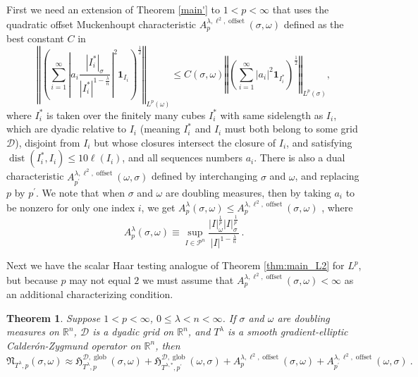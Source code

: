 \documentclass{amsart}%
\newtheorem{theorem}{Theorem}
\theoremstyle{plain}
\numberwithin{equation}{section}
\begin{document}
First we need an extension of Theorem \ref{main'} to $1<p<\infty$ that uses
the quadratic offset Muckenhoupt characteristic $A_{p}^{\lambda,\ell
^{2},\operatorname*{offset}}\left(  \sigma,\omega\right)  $ defined as the
best constant $C$ in%
\begin{equation}
\left\Vert \left(  \sum_{i=1}^{\infty}\left\vert a_{i}\frac{\left\vert
I_{i}^{\ast}\right\vert _{\sigma}}{\left\vert I_{i}^{\ast}\right\vert
^{1-\frac{\lambda}{n}}}\right\vert ^{2}\mathbf{1}_{I_{i}}\right)  ^{\frac
{1}{2}}\right\Vert _{L^{p}\left(  \omega\right)  }\leq C \left(  \sigma,\omega\right)  \left\Vert \left(
\sum_{i=1}^{\infty}\left\vert a_{i}\right\vert ^{2}\mathbf{1}_{I_{i}^{\ast}%
}\right)  ^{\frac{1}{2}}\right\Vert _{L^{p}\left(  \sigma\right)
},\label{quad A2 tailless}%
\end{equation}
where $I_{i}^{\ast}$ is taken over the finitely many cubes $I_{i}^{\ast}$ with
same sidelength as $I_{i}$, which are dyadic relative to $I_{i}$ (meaning
$I_{i}^{\ast}$ and $I_{i}$ must both belong to some grid $\mathcal{D}$),
disjoint from $I_{i}$ but whose closures intersect the closure of $I_{i}$, and
satisfying $\operatorname{dist}\left(  I_{i}^{\ast},I_{i}\right)  \leq
10\ell\left(  I_{i}\right)  $, and all sequences numbers $a_{i}$. There is
also a dual characteristic $A_{p^{\prime}}^{\lambda,\ell^{2}%
,\operatorname*{offset}}\left(  \omega,\sigma\right)  $ defined by
interchanging $\sigma$ and $\omega$, and replacing $p$ by $p^{\prime}$. We
note that when $\sigma$ and $\omega$ are doubling measures, then by taking
$a_{i}$ to be nonzero for only one index $i$, we get $A_{p}^{\lambda}%
(\sigma,\omega)\leq A_{p}^{\lambda,\ell^{2},\operatorname*{offset}}\left(
\sigma,\omega\right)  $ \cite{SaWi}, where
\[
A_{p}^{\lambda}\left(  \sigma,\omega\right)  \equiv\sup_{I\in\mathcal{P}^{n}%
}\frac{\left\vert I\right\vert _{\omega}^{\frac{1}{p}}\left\vert I\right\vert
_{\sigma}^{\frac{1}{p^{\prime}}}}{\left\vert I\right\vert ^{1-\frac{\lambda
}{n}}}\,.
\]


Next we have the scalar Haar testing analogue of Theorem \ref{thm:main_L2} for
$L^{p}$, but because $p$ may not equal $2$ we must assume that $A_{p}%
^{\lambda,\ell^{2},\operatorname*{offset}}\left(  \sigma,\omega\right)
<\infty$ as an additional characterizing condition.

\begin{theorem}
\label{thm:Lp_Haar_Ap_quad} \label{main' p}Suppose $1<p<\infty$, $0\leq
\lambda<n<\infty$. If $\sigma$ and $\omega$ are doubling measures on
$\mathbb{R}^{n}$, $\mathcal{D}$ is a dyadic grid on $\mathbb{R}^{n}$, and
$T^{\lambda}$ is a smooth gradient-elliptic Calder\'{o}n-Zygmund operator on
$\mathbb{R}^{n}$, then%
\[
\mathfrak{N}_{T^{\lambda},p}\left(  \sigma,\omega\right)  \approx
\mathfrak{H}_{T^{\lambda},p}^{\mathcal{D},\operatorname*{glob}}\left(
\sigma,\omega\right)  +\mathfrak{H}_{T^{\lambda,\ast},p^{\prime}}%
^{\mathcal{D},\operatorname*{glob}}\left(  \omega,\sigma\right)
+A_{p}^{\lambda,\ell^{2},\operatorname*{offset}}\left(  \sigma,\omega\right)
+A_{p^{\prime}}^{\lambda,\ell^{2},\operatorname*{offset}}\left(  \omega
,\sigma\right)  \ .
\]

\end{theorem}
\end{document}

